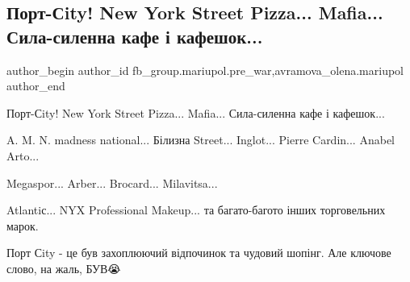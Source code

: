  
 
 
 
 

\subsection{Порт-Сity! New York Street Pizza... Mafia... Сила-силенна кафе і кафешок...}
\label{sec:09_02_2023.fb.fb_group.mariupol.pre_war.3.port_sity__new_york_}
 
\ifcmt
 author_begin
   author_id fb_group.mariupol.pre_war,avramova_olena.mariupol
 author_end
\fi

Порт-Сity! New York Street Pizza... Mafia... Сила-силенна кафе і кафешок...

A. M. N. madness national... Білизна Street... Inglot... Pierre Cardin... Anabel
Arto...

Megaspor... Arber... Brocard... Milavitsa...

Atlantiс... NYX Professional Makeup... та багато-багото інших торговельних марок.

Порт Сity - це був захоплюючий відпочинок та чудовий шопінг. Але ключове слово,
на жаль, БУВ😭


